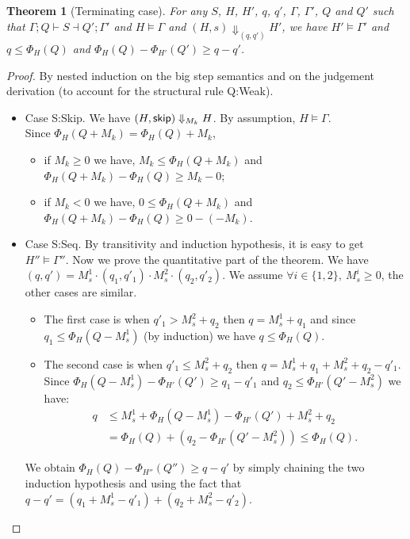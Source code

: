 \documentclass[nocopyrightspace,preprint]{sigplanconf}
\newtheorem{theorem}{Theorem}
\begin{document}
\begin{theorem}[Terminating case]
For any $S$, $H$, $H'$, $q$, $q'$, $\Gamma$, $\Gamma'$, $Q$ and $Q'$ such
that $\Gamma; Q \vdash S \dashv Q'; \Gamma'$ and $H \models \Gamma$ and
$(H,s) \Downarrow_{(q,q')} H'$, we have
$H' \models \Gamma'$ and
$q \le \Phi_H(Q)$ and
$\Phi_H(Q) - \Phi_{H'}(Q') \ge q - q'$.
\end{theorem}

\begin{proof} By nested induction on the big step semantics and on the
judgement derivation (to account for the structural rule {\sc Q:Weak}).

\begin{itemize}

\item Case {\sc S:Skip}.
  We have $(H, \mathsf{skip}) \Downarrow_{M_k} H$.
  By assumption, $H \models \Gamma$. \\
  Since $\Phi_H(Q + M_k) = \Phi_H(Q) + M_k$,
  \begin{itemize}[topsep=0pt]
  \item
    if $M_k \ge 0$ we have,
      $M_k \le \Phi_H(Q + M_k)$ and
      $\Phi_H(Q + M_k) - \Phi_H(Q) \ge M_k - 0$;
  \item
    if $M_k < 0$ we have,
      $0 \le \Phi_H(Q + M_k)$ and
      $\Phi_H(Q + M_k) - \Phi_H(Q) \ge 0 - (-M_k)$.
  \end{itemize}

\item Case {\sc S:Seq}.
  By transitivity and induction hypothesis, it is
  easy to get $H'' \models \Gamma''$.  Now we prove
  the quantitative part of the theorem.  We have
  $(q, q') = M_s^1 \cdot (q_1, q'_1) \cdot M_s^2 \cdot (q_2, q'_2)$.
  We assume $\forall i \in \{1, 2\},~M_s^i \ge 0$, the other cases
  are similar.
  \begin{itemize}[topsep=0pt]
  \item
    The first case is when $q'_1 > M_s^2 + q_2$ then $q = M_s^1 + q_1$
    and since $q_1 \le \Phi_H(Q - M_s^1)$ (by induction) we have
    $q \le \Phi_H(Q)$.
  \item
    The second case is when $q'_1 \le M_s^2 + q_2$ then $q = M_s^1 + q_1 + M_s^2 + q_2 - q'_1$. \\
    Since $\Phi_H(Q - M_s^1) - \Phi_{H'}(Q') \ge q_1 - q'_1$
    and $q_2 \le \Phi_{H'}(Q' - M_s^2)$ we have:
    \begin{align*}
    q &\le M_s^1 + \Phi_H(Q - M_s^1) - \Phi_{H'}(Q') + M_s^2 + q_2 \\
      &= \Phi_H(Q) + (q_2 - \Phi_{H'}(Q' - M_s^2)) \le \Phi_H(Q).
   \end{align*}
  \end{itemize}
  We obtain $\Phi_H(Q) - \Phi_{H''}(Q'') \ge q - q'$ by simply chaining
  the two induction hypothesis and using the fact that $q - q' =
  (q_1 + M_s^1 - q'_1) + (q_2 + M_s^2 - q'_2)$.


\end{itemize}
\end{proof}
\end{document}
